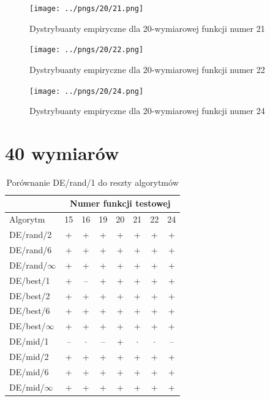 \documentclass[a4paper,onecolumn,oneside,12pt,wide,floatssmall]{mwrep}
\theoremstyle{definition}
\theoremstyle{plain}%
\theoremstyle{remark}
\begin{document}
\begin{figure}[H]
\centering
\texttt{[image: ../pngs/20/21.png]}
\caption{Dystrybuanty empiryczne dla 20-wymiarowej funkcji numer 21}
\end{figure}

\begin{figure}[H]
\centering
\texttt{[image: ../pngs/20/22.png]}
\caption{Dystrybuanty empiryczne dla 20-wymiarowej funkcji numer 22}
\end{figure}

\begin{figure}[H]
\centering
\texttt{[image: ../pngs/20/24.png]}
\caption{Dystrybuanty empiryczne dla 20-wymiarowej funkcji numer 24}
\end{figure}

\section{40 wymiarów}

\begin{table}[H]
\centering
\begin{tabular}{ l | c | c | c | c | c | c | c }
		 & \multicolumn{7}{c}{Numer funkcji testowej}  \\  \hline
Algorytm         &15& 16& 19& 20& 21& 22& 24 \\ \hline
DE/rand/2	 & + & + & + & + & + & + & + \\
DE/rand/6	 & + & + & + & + & + & + & + \\
DE/rand/$\infty$	 & + & + & + & + & + & + & + \\
DE/best/1	 & + & -- & + & + & + & + & + \\
DE/best/2	 & + & + & + & + & + & + & + \\
DE/best/6	 & + & + & + & + & + & + & + \\
DE/best/$\infty$	 & + & + & + & + & + & + & + \\
DE/mid/1	 & -- & $\cdot$ & -- & + & $\cdot$ & $\cdot$ & -- \\
DE/mid/2	 & + & + & + & + & + & + & + \\
DE/mid/6	 & + & + & + & + & + & + & + \\
DE/mid/$\infty$	 & + & + & + & + & + & + & + \\
\end{tabular}
\caption{Porównanie DE/rand/1 do reszty algorytmów}
\end{table}
\end{document}
